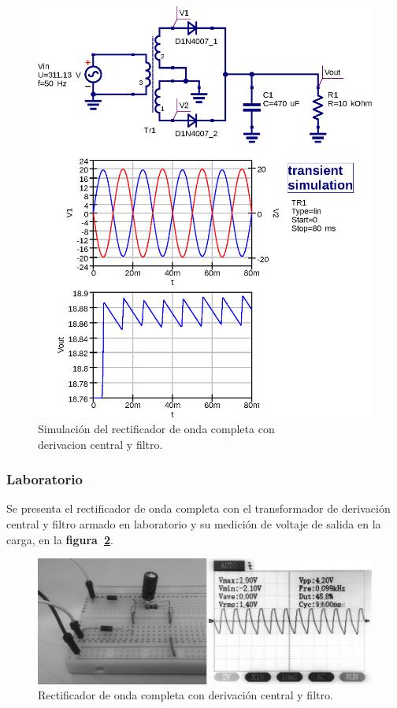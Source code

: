 \begin{figure}[!h]
\centering
\includegraphics[scale=0.75]{simulacion/06.derivacion_central2.eps}
\caption{Simulación del rectificador de onda completa con \\
derivacion central y filtro.}
\label{simulacion06}
\end{figure}

\subsubsection{Laboratorio}
Se presenta el rectificador de onda completa con el transformador de derivación
central y filtro armado en laboratorio y su medición de voltaje de salida en la
carga, en la \textbf{figura~\ref{laboratorio08}}.

\begin{figure}[!h]
\centering
\includegraphics[scale=0.28]{fotos/06.derivacion_central2.eps}
\caption{Rectificador de onda completa con derivación central y filtro.}
\label{laboratorio08}
\end{figure}

